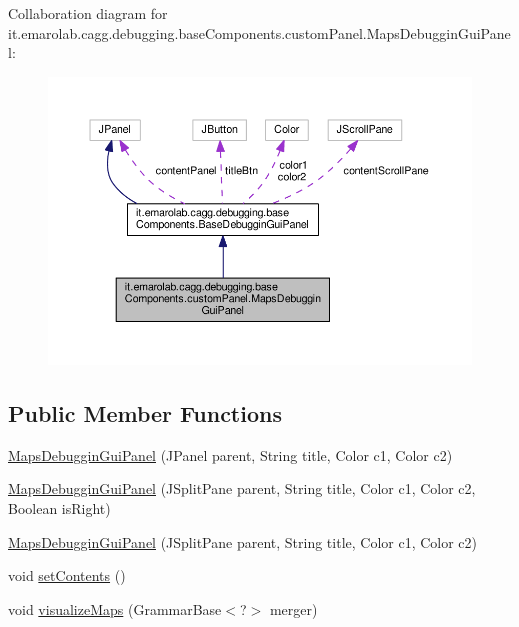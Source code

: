 Collaboration diagram for it.\-emarolab.\-cagg.\-debugging.\-base\-Components.\-custom\-Panel.\-Maps\-Debuggin\-Gui\-Panel\-:\nopagebreak
\begin{figure}[H]
\begin{center}
\leavevmode
\includegraphics[width=350pt]{classit_1_1emarolab_1_1cagg_1_1debugging_1_1baseComponents_1_1customPanel_1_1MapsDebugginGuiPanel__coll__graph}
\end{center}
\end{figure}
\subsection*{Public Member Functions}
\begin{DoxyCompactItemize}
\item 
\hyperlink{classit_1_1emarolab_1_1cagg_1_1debugging_1_1baseComponents_1_1customPanel_1_1MapsDebugginGuiPanel_aa2932c044f276b05cf7e8fa0ba8bc133}{Maps\-Debuggin\-Gui\-Panel} (J\-Panel parent, String title, Color c1, Color c2)
\item 
\hyperlink{classit_1_1emarolab_1_1cagg_1_1debugging_1_1baseComponents_1_1customPanel_1_1MapsDebugginGuiPanel_a742180d1b253d4417d8fccb80b4c2be1}{Maps\-Debuggin\-Gui\-Panel} (J\-Split\-Pane parent, String title, Color c1, Color c2, Boolean is\-Right)
\item 
\hyperlink{classit_1_1emarolab_1_1cagg_1_1debugging_1_1baseComponents_1_1customPanel_1_1MapsDebugginGuiPanel_a0ddecf8dc41a344423c52ce827c5f771}{Maps\-Debuggin\-Gui\-Panel} (J\-Split\-Pane parent, String title, Color c1, Color c2)
\item 
void \hyperlink{classit_1_1emarolab_1_1cagg_1_1debugging_1_1baseComponents_1_1customPanel_1_1MapsDebugginGuiPanel_af33f12a39a717f8405195417dddef4b5}{set\-Contents} ()
\item 
void \hyperlink{classit_1_1emarolab_1_1cagg_1_1debugging_1_1baseComponents_1_1customPanel_1_1MapsDebugginGuiPanel_a1752a4242dc8d7b8ccda214f7c12d892}{visualize\-Maps} (Grammar\-Base$<$?$>$ merger)
\end{DoxyCompactItemize}

